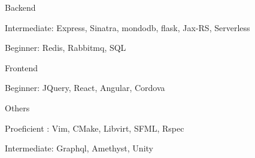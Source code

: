 \begin{cvskills}
  \cvskill
    {Backend} %
    {
      \begin{cvitems} %
        \item Intermediate:                 Express, Sinatra, mondodb, flask, Jax-RS, Serverless
        \item Beginner:\hspace{5mm}         Redis, Rabbitmq, SQL
      \end{cvitems}
    }
  \cvskill
    {Frontend} %
    {
      \begin{cvitems} %
      \item Beginner:\hspace{5mm}                     JQuery, React, Angular, Cordova
      \end{cvitems}
    }
  \cvskill
    {Others} %
    {
      \begin{cvitems} %
      \item Proeficient :\hspace{2.5mm}   Vim, CMake, Libvirt, SFML, Rspec
      \item Intermediate:\hspace{0.5mm} Graphql, Amethyst, Unity
      \end{cvitems}
    }


\end{cvskills}
